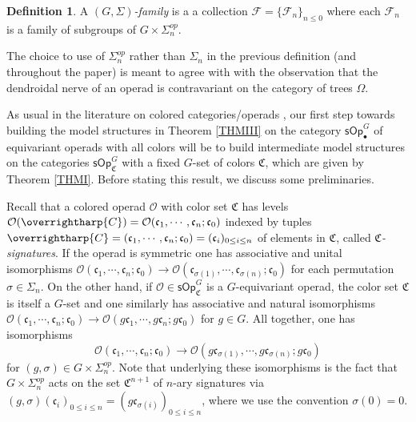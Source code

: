 \documentclass[a4paper,10pt
,draft
]{article}%
\numberwithin{equation}{section}
\numberwithin{figure}{section}
\theoremstyle{definition} %
\newtheorem{definition}[equation]{Definition}%
\newcommand{\vect}[1]{\text{\overrightharp{\ensuremath{#1}}}}
\renewcommand{\O}{\ensuremath{\mathcal O}}
\newcommand{\1}{\ensuremath{\mathbbm 1}}%
\begin{document}
\begin{definition}\label{FAM1ST DEF}
	A \emph{$(G,\Sigma)$-family} is a
	a collection
	$\mathcal{F} = \{\mathcal{F}_n\}_{n \leq 0}$
	where each $\mathcal{F}_n$
	is a family of subgroups of $G \times \Sigma_n^{op}$.
\end{definition}

The choice to use of $\Sigma_n^{op}$ rather than $\Sigma_n$
in the previous definition (and throughout the paper) is meant to agree with 
with the observation that the dendroidal nerve of an operad is contravariant on the category of trees $\Omega$.


As usual in the literature on colored categories/operads
\cite{BM07,Rob11,CM13b,Cav},
our first step towards building the model structures 
in Theorem \ref{THMIII}
on the category
$\mathsf{sOp}^G_{\bullet}$
of equivariant operads with all colors 
will be to build intermediate model structures on the categories
$\mathsf{sOp}^G_{\mathfrak{C}}$
with a fixed $G$-set of colors $\mathfrak{C}$,
which are given by Theorem \ref{THMI}.
Before stating this result, we discuss some preliminaries.



Recall that a colored operad $\O$
with color set $\mathfrak{C}$ has levels 
$
\O(\vect{C})=
\O(\mathfrak{c}_1,\cdots,\mathfrak{c}_n;\mathfrak{c}_0)$
indexed by tuples
$\vect{C} = (\mathfrak{c}_1,\cdots,\mathfrak{c}_n;\mathfrak{c}_0) = (\mathfrak c_i)_{0 \leq i \leq n}$
of elements in $\mathfrak{C}$, called \emph{$\mathfrak{C}$-signatures}.
If the operad is symmetric one has associative and unital isomorphisms
$
\O(\mathfrak{c}_1,\cdots,\mathfrak{c}_n;\mathfrak{c}_0) \to 
\O(\mathfrak{c}_{\sigma(1)},\cdots,\mathfrak{c}_{\sigma(n)};\mathfrak{c}_0)
$
for each permutation $\sigma \in \Sigma_n$.
On the other hand, if 
$\O \in \mathsf{sOp}^G_{\mathfrak{C}}$
is a $G$-equivariant operad, 
the color set $\mathfrak{C}$ is itself a $G$-set
and one similarly has associative and natural isomorphisms
$
\O(\mathfrak{c}_1,\cdots,\mathfrak{c}_n;\mathfrak{c}_0) \to 
\O(g\mathfrak{c}_{1},\cdots,g\mathfrak{c}_{n};g\mathfrak{c}_0)
$ for $g \in G$.
All together, one has isomorphisms
\begin{equation}\label{OPSSYMS EQ}
\O(\mathfrak{c}_1,\cdots,\mathfrak{c}_n;\mathfrak{c}_0)
\to 
\O(g \mathfrak{c}_{\sigma(1)},\cdots,g \mathfrak{c}_{\sigma(n)};g\mathfrak{c}_0)
\end{equation}
for $(g,\sigma) \in G \times \Sigma_n^{op}$.
Note that underlying these isomorphisms is the fact that
$G \times \Sigma_n^{op}$
acts on the set $\mathfrak{C}^{n+1}$ of $n$-ary signatures via
$(g,\sigma) (\mathfrak{c}_i)_{0\leq i \leq n}
= (g \mathfrak{c}_{\sigma(i)})_{0\leq i \leq n}$,
where we use the convention $\sigma(0)=0$.
\end{document}

